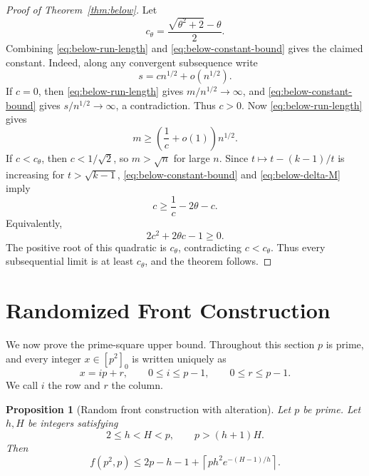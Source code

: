 \documentclass[11pt]{article}
\newtheorem{proposition}[theorem]{Proposition}
\theoremstyle{remark}
\newcommand{\ceil}[1]{\left\lceil #1\right\rceil}
\numberwithin{equation}{section}
\begin{document}
\begin{proof}[Proof of Theorem~\ref{thm:below}]
Let
\begin{equation}\label{eq:below-ctheta}
        c_\theta=\frac{\sqrt{\theta^2+2}-\theta}{2}.
\end{equation}
Combining \eqref{eq:below-run-length} and \eqref{eq:below-constant-bound} gives the claimed constant.
Indeed, along any convergent subsequence write
\[
        s=c n^{1/2}+o(n^{1/2}).
\]
If $c=0$, then \eqref{eq:below-run-length} gives $m/n^{1/2}\to\infty$, and \eqref{eq:below-constant-bound} gives $s/n^{1/2}\to\infty$, a contradiction.
Thus $c>0$.
Now \eqref{eq:below-run-length} gives
\[
        m\ge \left(\frac1c+o(1)\right)n^{1/2}.
\]
If $c<c_\theta$, then $c<1/\sqrt2$, so $m>\sqrt n$ for large $n$.
Since $t\mapsto t-(k-1)/t$ is increasing for $t>\sqrt{k-1}$, \eqref{eq:below-constant-bound} and \eqref{eq:below-delta-M} imply
\[
        c
        \ge
        \frac1c-2\theta-c.
\]
Equivalently,
\[
        2c^2+2\theta c-1\ge0.
\]
The positive root of this quadratic is $c_\theta$, contradicting $c<c_\theta$.
Thus every subsequential limit is at least $c_\theta$, and the theorem follows.
\end{proof}

\section{Randomized Front Construction}

We now prove the prime-square upper bound.
Throughout this section $p$ is prime, and every integer $x\in[p^2]_0$ is written uniquely as
\[
        x=ip+r,
        \qquad
        0\le i\le p-1,
        \qquad
        0\le r\le p-1.
\]
We call $i$ the row and $r$ the column.


\begin{proposition}[Random front construction with alteration]\label{prop:random-front}
Let $p$ be prime.
Let $h,H$ be integers satisfying
\[
        2\le h<H<p,
        \qquad
        p>(h+1)H.
\]
Then
\[
        f(p^2,p)
        \le
        2p-h-1+
        \ceil{p h^2 e^{-(H-1)/h}}.
\]
\end{proposition}
\end{document}
